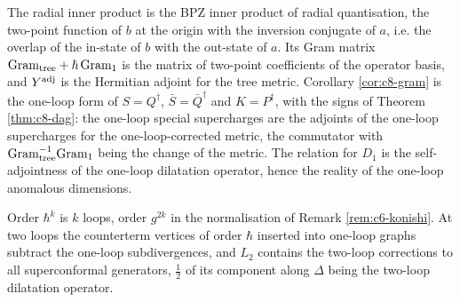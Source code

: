 \begin{remark}[Physics notation: BPZ inner product and $Q^\dagger=S$]
The radial inner product is the BPZ inner product of radial quantisation, the two-point function of $b$ at the origin with the inversion conjugate of $a$, i.e. the overlap of the in-state of $b$ with the out-state of $a$. Its Gram matrix $\mathrm{Gram}_{\rm tree}+\hbar\,\mathrm{Gram}_1$ is the matrix of two-point coefficients of the operator basis, and $Y^{\rm adj}$ is the Hermitian adjoint for the tree metric. Corollary \ref{cor:c8-gram} is the one-loop form of $S=Q^\dagger$, $\bar S=\bar Q^\dagger$ and $K=P^\dagger$, with the signs of Theorem \ref{thm:c8-dag}: the one-loop special supercharges are the adjoints of the one-loop supercharges for the one-loop-corrected metric, the commutator with $\mathrm{Gram}_{\rm tree}^{-1}\mathrm{Gram}_1$ being the change of the metric. The relation for $D_1$ is the self-adjointness of the one-loop dilatation operator, hence the reality of the one-loop anomalous dimensions.
\end{remark}

\begin{remark}
Order $\hbar^k$ is $k$ loops, order $g^{2k}$ in the normalisation of Remark \ref{rem:c6-konishi}. At two loops the counterterm vertices of order $\hbar$ inserted into one-loop graphs subtract the one-loop subdivergences, and $L_2$ contains the two-loop corrections to all superconformal generators, $\tfrac12$ of its component along $\Delta$ being the two-loop dilatation operator.
\end{remark}

